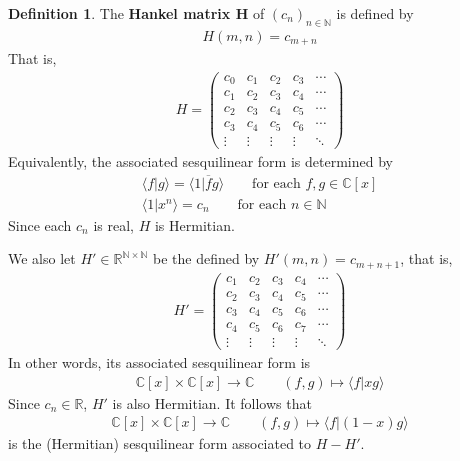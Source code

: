 \documentclass[12pt,b5paper,notitlepage]{article}
\theoremstyle{definition}
\newtheorem{df}{Definition}[subsection]
\theoremstyle{plain}
\newcommand{\ovl}{\overline}
\newcommand{\bk}[1]{\langle {#1}\rangle}
\newcommand{\bigbk}[1]{\big\langle {#1}\big\rangle}
\newcommand{\Cbb}{\mathbb C}
\newcommand{\Nbb}{\mathbb N}
\newcommand{\Rbb}{\mathbb R}
\newcommand{\hqed}{\hfill\qedsymbol}
\numberwithin{equation}{section}
\begin{document}
\begin{df}\label{lb203}
The \textbf{Hankel matrix $\pmb H$}  of $(c_n)_{n\in\Nbb}$ is defined by
\begin{align*}
H(m,n)=c_{m+n}
\end{align*}
That is,
\begin{align*}
H=\begin{pmatrix}
c_0&c_1&c_2&c_3&\cdots\\
c_1&c_2&c_3&c_4&\cdots\\
c_2&c_3&c_4&c_5&\cdots\\
c_3&c_4&c_5&c_6&\cdots\\
\vdots&\vdots&\vdots&\vdots&\ddots
\end{pmatrix}
\end{align*}
Equivalently, the associated sesquilinear form is determined by
\begin{subequations}\label{eq80}
\begin{gather}
\bigbk{f\big|g}=\bigbk{1\big|\ovl fg}\qquad\text{for each }f,g\in\Cbb[x]\label{eq80a}\\
\bigbk{1\big|x^n}=c_n\qquad\text{for each }n\in\Nbb\label{eq80b}
\end{gather}
\end{subequations}
Since each $c_n$ is real, $H$ is Hermitian.

We also let $H'\in\Rbb^{\Nbb\times \Nbb}$ be the defined by $H'(m,n)=c_{m+n+1}$, that is,
\begin{align*}
H'=\begin{pmatrix}
c_1&c_2&c_3&c_4&\cdots\\
c_2&c_3&c_4&c_5&\cdots\\
c_3&c_4&c_5&c_6&\cdots\\
c_4&c_5&c_6&c_7&\cdots\\
\vdots&\vdots&\vdots&\vdots&\ddots
\end{pmatrix}
\end{align*}
In other words, its associated sesquilinear form is
\begin{align}\label{eq81}
\Cbb[x]\times\Cbb[x]\rightarrow\Cbb\qquad (f,g)\mapsto \bk{f|xg}
\end{align}
Since $c_n\in\Rbb$, $H'$ is also Hermitian. It follows that
\begin{align}\label{eq82}
\Cbb[x]\times\Cbb[x]\rightarrow\Cbb\qquad (f,g)\mapsto \bk{f|(1-x)g}
\end{align}
is the (Hermitian) sesquilinear form associated to $H-H'$. \hqed
\end{df}
\end{document}
